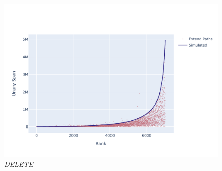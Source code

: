 \documentclass[10pt,twoside,lineno]{gsajnl}
\newcommand{\T}{\mathbb{T}}
\newcommand{\tn}{\textnormal}
\newcommand{\comment}[1]{{\color{violet} \it #1}}
\begin{document}
%
%
%
%
%

\begin{figure}
	\includegraphics[width=0.9\linewidth]{newplots_wo_ee/better_unary_spans_ep_notlog.pdf}
	\caption{\comment{DELETE}}
	\label{fig:correct-unary-span}
\end{figure}
\end{document}
